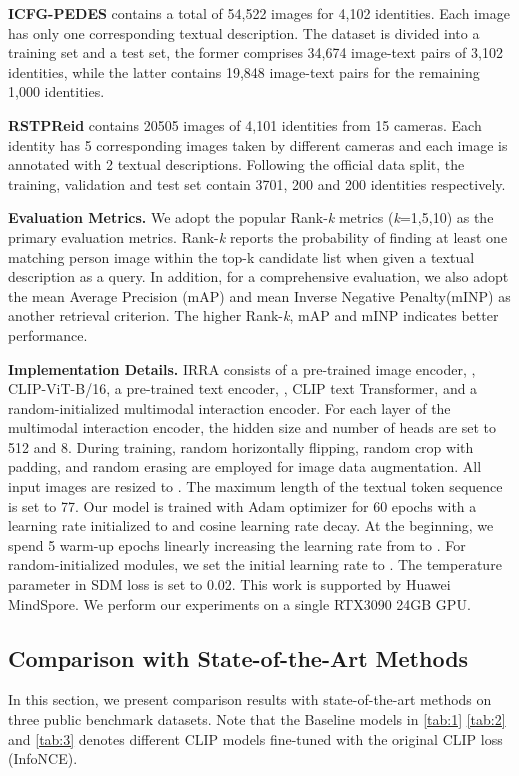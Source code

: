 \documentclass[10pt,twocolumn,letterpaper]{article}
\begin{document}
\textbf{ICFG-PEDES} \cite{ding2021semantically} contains a total of 54,522 images for 4,102 identities. Each image has only one corresponding textual description. The dataset is divided into a training set and a test set, the former comprises 34,674 image-text pairs of 3,102 identities, while the latter contains 19,848 image-text pairs for the remaining 1,000 identities.

\textbf{RSTPReid} \cite{zhu2021dssl} contains 20505 images of 4,101 identities from 15 cameras. Each identity has 5 corresponding images taken by different cameras and each image is annotated with 2 textual descriptions. Following the official data split, the training, validation and test set contain 3701, 200 and 200 identities respectively.


\textbf{Evaluation Metrics.} We adopt the popular Rank-\textit{k} metrics (\textit{k}=1,5,10) as the primary evaluation metrics. Rank-\textit{k} reports the probability of finding at least one matching person image within the top-k candidate list when given a textual description as a query. In addition, for a comprehensive evaluation, we also adopt the mean Average Precision (mAP) and mean Inverse Negative Penalty(mINP)\cite{ye2021deep} as another retrieval criterion. The higher Rank-\textit{k}, mAP and mINP indicates better performance.

\textbf{Implementation Details.} IRRA consists of a pre-trained image encoder, \ie, CLIP-ViT-B/16, a pre-trained text encoder, \ie, CLIP text Transformer, and a random-initialized multimodal interaction encoder. For each layer of the multimodal interaction encoder, the hidden size and number of heads are set to 512 and 8. During training, random horizontally flipping, random crop with padding, and random erasing are employed for image data augmentation. All input images are resized to . The maximum length of the textual token sequence  is set to 77. Our model is trained with Adam optimizer\cite{kingma2015adam} for 60 epochs with a learning rate initialized to  and  cosine learning rate decay. At the beginning, we spend 5 warm-up epochs linearly increasing the learning rate from  to . For random-initialized modules, we set the initial learning rate to . The temperature parameter  in SDM loss is set to 0.02. This work is supported by Huawei MindSpore\cite{mindspore}. We perform our experiments on a single RTX3090 24GB GPU.

\subsection{Comparison with State-of-the-Art Methods}
In this section, we present comparison results with state-of-the-art methods on three public benchmark datasets.
Note that the Baseline models in \cref{tab:1} \ref{tab:2} and \ref{tab:3} denotes different CLIP models fine-tuned with the original CLIP loss (InfoNCE\cite{oord2018representation}).
\end{document}
